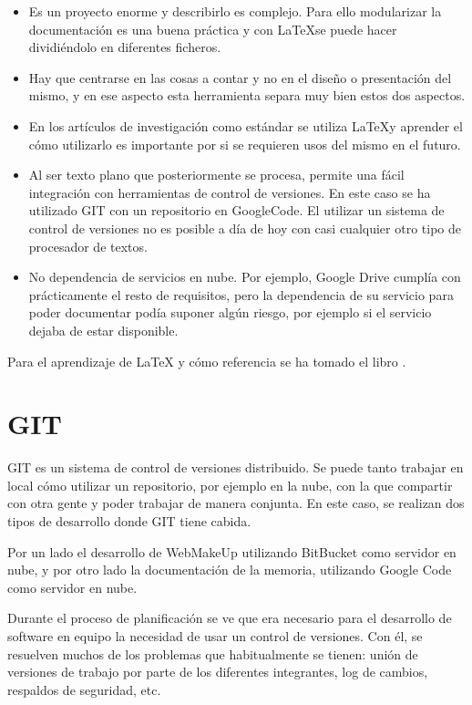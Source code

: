 \begin{itemize}
\item{Es un proyecto enorme y describirlo es complejo. Para ello modularizar la documentación es una buena práctica y con \LaTeX se puede hacer dividiéndolo en diferentes ficheros.}
\item{Hay que centrarse en las cosas a contar y no en el diseño o presentación del mismo, y en ese aspecto esta herramienta separa muy bien estos dos aspectos.}
\item{En los artículos de investigación como estándar se utiliza \LaTeX y aprender el cómo utilizarlo es importante por si se requieren usos del mismo en el futuro.}
\item{Al ser texto plano que posteriormente se procesa, permite una fácil integración con herramientas de control de versiones. En este caso se ha utilizado GIT con un repositorio en GoogleCode. El utilizar un sistema de control de versiones no es posible a día de hoy con casi cualquier otro tipo de procesador de textos.}
\item{No dependencia de servicios en nube. Por ejemplo, Google Drive cumplía con prácticamente el resto de requisitos, pero la dependencia de su servicio para poder documentar podía suponer algún riesgo, por ejemplo si el servicio dejaba de estar disponible.}
\end{itemize}

Para el aprendizaje de LaTeX y cómo referencia se ha tomado el libro \cite{WikiLatex}.

\section{GIT}
\label{sec:GIT}

GIT es un sistema de control de versiones distribuido. Se puede tanto trabajar en local cómo utilizar un repositorio, por ejemplo en la nube, con la que compartir con otra gente y poder trabajar de manera conjunta. En este caso, se realizan dos tipos de desarrollo donde GIT tiene cabida.

Por un lado el desarrollo de WebMakeUp utilizando BitBucket como servidor en nube, y por otro lado la documentación de la memoria, utilizando Google Code como servidor en nube.

Durante el proceso de planificación se ve que era necesario para el desarrollo de software en equipo la necesidad de usar un control de versiones. Con él, se resuelven muchos de los problemas que habitualmente se tienen: unión de versiones de trabajo por parte de los diferentes integrantes, log de cambios, respaldos de seguridad, etc.

